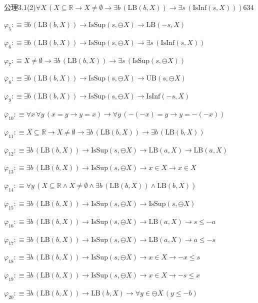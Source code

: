 \begin{fullproof}{公理3.1(2)}{$\forall X\,(X \subseteq \mathbb{R} \to X \neq \emptyset \to \exists b\,(\mathrm{LB}(b,X)) \to \exists s\,(\mathrm{IsInf}(s,X)))$}{634}
\begin{abbrevlist}
\item $\varphi_{5} :\equiv \exists b\,(\mathrm{LB}(b,X)) \to \mathrm{IsSup}(s,\ominus X) \to \mathrm{LB}(-s,X)$
\item $\varphi_{6} :\equiv \exists b\,(\mathrm{LB}(b,X)) \to \mathrm{IsSup}(s,\ominus X) \to \exists s\,(\mathrm{IsInf}(s,X))$
\item $\varphi_{7} :\equiv X \neq \emptyset \to \exists b\,(\mathrm{LB}(b,X)) \to \exists s\,(\mathrm{IsSup}(s,\ominus X))$
\item $\varphi_{8} :\equiv \exists b\,(\mathrm{LB}(b,X)) \to \mathrm{IsSup}(s,\ominus X) \to \mathrm{UB}(s,\ominus X)$
\item $\varphi_{9} :\equiv \exists b\,(\mathrm{LB}(b,X)) \to \mathrm{IsSup}(s,\ominus X) \to \mathrm{IsInf}(-s,X)$
\item $\varphi_{10} :\equiv \forall x\,\forall y\,(x = y \to y = x) \to \forall y\,(-(-x) = y \to y = -(-x))$
\item $\varphi_{11} :\equiv X \subseteq \mathbb{R} \to X \neq \emptyset \to \exists b\,(\mathrm{LB}(b,X)) \to \exists b\,(\mathrm{LB}(b,X))$
\item $\varphi_{12} :\equiv \exists b\,(\mathrm{LB}(b,X)) \to \mathrm{IsSup}(s,\ominus X) \to \mathrm{LB}(a,X) \to \mathrm{LB}(a,X)$
\item $\varphi_{13} :\equiv \exists b\,(\mathrm{LB}(b,X)) \to \mathrm{IsSup}(s,\ominus X) \to x \in X \to x \in X$
\item $\varphi_{14} :\equiv \forall y\,(X \subseteq \mathbb{R} \land X \neq \emptyset \land \exists b\,(\mathrm{LB}(b,X)) \land \mathrm{LB}(b,X))$
\item $\varphi_{15} :\equiv \exists b\,(\mathrm{LB}(b,X)) \to \mathrm{IsSup}(s,\ominus X) \to \mathrm{IsSup}(s,\ominus X)$
\item $\varphi_{16} :\equiv \exists b\,(\mathrm{LB}(b,X)) \to \mathrm{IsSup}(s,\ominus X) \to \mathrm{LB}(a,X) \to s \leq -a$
\item $\varphi_{17} :\equiv \exists b\,(\mathrm{LB}(b,X)) \to \mathrm{IsSup}(s,\ominus X) \to \mathrm{LB}(a,X) \to a \leq -s$
\item $\varphi_{18} :\equiv \exists b\,(\mathrm{LB}(b,X)) \to \mathrm{IsSup}(s,\ominus X) \to x \in X \to -x \leq s$
\item $\varphi_{19} :\equiv \exists b\,(\mathrm{LB}(b,X)) \to \mathrm{IsSup}(s,\ominus X) \to x \in X \to -s \leq x$
\item $\varphi_{20} :\equiv \exists b\,(\mathrm{LB}(b,X)) \to \mathrm{LB}(b,X) \to \forall y \in \ominus X\,(y \leq -b)$

\end{abbrevlist}
\end{fullproof}
